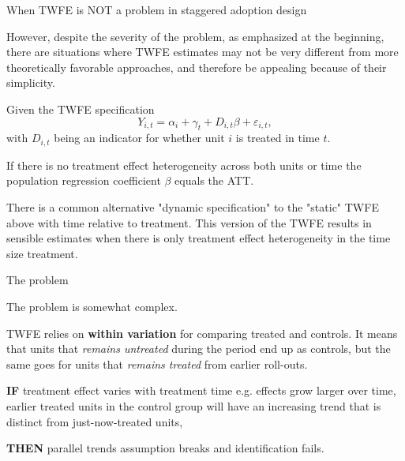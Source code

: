 \documentclass[notes,11pt, aspectratio=169]{beamer}
\newenvironment{wideitemize}{\itemize\addtolength{\itemsep}{10pt}}{\enditemize}
\begin{document}
\begin{frame}{When TWFE is NOT a problem in staggered adoption design}
      \begin{wideitemize}
         \item However, despite the severity of the problem, as emphasized at the beginning, there are situations where TWFE estimates may not be very different from more theoretically favorable approaches, and therefore be appealing because of their simplicity.

        \item Given the TWFE specification 
         \begin{equation*} 
Y_{i,t}=\alpha_i + \gamma_t +D_{i,t}\beta +\varepsilon_{i,t},  
         \end{equation*}
with $D_{i,t}$ being an indicator for whether unit $i$ is treated in time $t$. 
      
         \item If there is no treatment effect heterogeneity across both units or time the population regression coefficient $\beta$ equals the ATT.
         \item There is a common alternative "dynamic specification" to the "static" TWFE above   with time relative to treatment. This version of the TWFE results in sensible estimates when there is only treatment effect heterogeneity in the time size treatment. %
        \end{wideitemize}
\end{frame}

\begin{frame}{The problem}
      \begin{wideitemize}
        \item The problem is somewhat complex. 
        \item TWFE relies on \textbf{within variation} for comparing treated and controls. It means that units that \textit{remains untreated} during the period end up as controls, but the same goes for units that \textit{remains treated} from earlier roll-outs.
        \item \textbf{IF} treatment effect varies with treatment time e.g. effects grow larger over time, earlier treated units in the control group will have an increasing trend that is distinct from just-now-treated units, 
        \item \textbf{THEN} parallel trends assumption breaks and identification fails.  
        \end{wideitemize}
        \end{frame}
        
\end{document}
